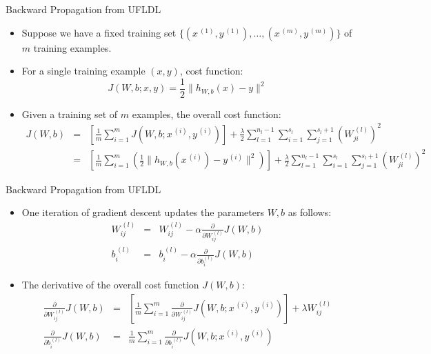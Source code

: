 \documentclass[10pt]{beamer}
\begin{document}
	\begin{frame}{Backward Propagation from UFLDL}
		\begin{itemize}
			\pause
			\item Suppose we have a fixed training set $\{(x^{\,(1)},y^{\,(1)}),\dots,(x^{\,(m)},y^{\,(m)})\}$ of $m$ training examples.
			\pause
			\item For a single training example $(x, y)$, cost function:
			$$J(W,b;x,y)=\frac{1}{2}\lVert h_{W,b}(x)-y\rVert^2$$
			
			\pause
			\item Given a training set of $m$ examples, the overall cost function:
			\begin{eqnarray*}
				J(W,b)&=&\left[\frac{1}{m}\sum_{i=1}^mJ(W,b;x^{\,(i)},y^{\,(i)})\right]+\frac{\lambda}{2}\sum_{l=1}^{n_l-1}\sum_{i=1}^{s_l}\sum_{j=1}^{s_l+1}\left(W_{ji}^{\,(l)}\right)^2\\
				&=&\left[\frac{1}{m}\sum_{i=1}^m\left(\frac{1}{2}\lVert h_{W,b}(x^{\,(i)})-y^{\,(i)}\rVert^2\right)\right]+\frac{\lambda}{2}\sum_{l=1}^{n_l-1}\sum_{i=1}^{s_l}\sum_{j=1}^{s_l+1}\left(W_{ji}^{\,(l)}\right)^2
			\end{eqnarray*}
		\end{itemize}
	\end{frame}

	\begin{frame}{Backward Propagation from UFLDL}
		\begin{itemize}
			\pause
			\item One iteration of gradient descent updates the parameters $W, b$ as follows:
			\begin{eqnarray*}
				W_{ij}^{\,(l)}&=&W_{ij}^{\,(l)}-\alpha\frac{\partial}{\partial W_{ij}^{\,(l)}}J(W,b)\\
				b_i^{\,(l)}&=&b_i^{\,(l)}-\alpha\frac{\partial}{\partial b_i^{(l)}}J(W,b)
			\end{eqnarray*}
			
			\pause
			\item The derivative of the overall cost function $J(W,b)$:
			\begin{eqnarray*}
				\frac{\partial}{\partial W_{ij}^{\,(l)}}J(W,b)&=&\left[\frac{1}{m}\sum_{i=1}^m\frac{\partial}{\partial W_{ij}^{\,(l)}}J(W,b;x^{\,(i)},y^{\,(i)})\right]+\lambda W_{ij}^{\,(l)}\\
				\frac{\partial}{\partial b_i^{\,(l)}}J(W,b)&=&\frac{1}{m}\sum_{i=1}^m\frac{\partial}{\partial b_i^{\,(l)}}J(W,b;x^{\,(i)},y^{\,(i)})
			\end{eqnarray*}
		\end{itemize}
	\end{frame}
\end{document}
